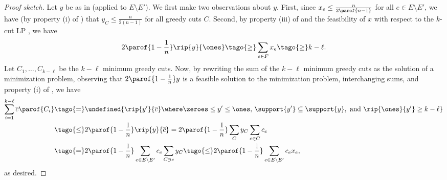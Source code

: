 \documentclass[11pt]{article}
\numberwithin{equation}{section}
\theoremstyle{definition}
\theoremstyle{plain}
\let\minof\undefined\usepackage{math} %
\newcommand{\costof}[1]{c_{#1}}
\providecommand{\sumcost}{\overline{c}\parof} %
\providecommand{\sumcostv}{\overline{c}} %
\newcommand{\wrt}{with respect to\xspace} %
\begin{document}
\bigskip

\begin{proof}[Proof sketch]
  Let $y$ be as in  (applied to $E \setminus
  E'$). We first make two observations about $y$. First, since
  \begin{math}
    x_e \leq \frac{n}{2 \parof{n-1}}
  \end{math}
  for all $e \in E \setminus E'$, we have (by property (i) of
  ) that
  \begin{math}
    y_C \leq \frac{n}{2(n-1)}
  \end{math}
  for all greedy cuts $C$. Second, by \tagr property (iii) of
   and \tagr the feasibility of $x$ \wrt the
  $k$-cut LP , we have
  \begin{align*}
    2 \parof{1 - \frac{1}{n}}\rip{y}{\ones}              %
    \tago{\geq}                    %
    \sum_{e \in F} x_e          %
    \tago{\geq}                 %
    k - \ell.
  \end{align*}
  Let $C_1,\dots,C_{k-\ell}$ be the $k-\ell$ minimum greedy cuts.
  Now, by \tagr rewriting the sum of the $k-\ell$ minimum greedy cuts
  as the solution of a minimization problem, \tagr observing that
  $2 \parof{1 - \frac{1}{n}} y$ is a feasible solution to the
  minimization problem, \tagr interchanging sums, and \tagr property
  (i) of , we have
  \begin{align*}
    \sum_{i=1}^{k-\ell} \sumcost{C_i} %
    &\tago{=}                                               %
      \minof{                                           %
      \rip{y'}{\sumcostv}                              %
      \where                                          %
      \zeroes \leq y' \leq \ones
      \text{, }                       %
      \support{y'} \subseteq \support{y},               %
      \text{ and }
      \rip{\ones}{y'} \geq k - \ell
      } \\
    &\tago{\leq}                       %
      2 \parof{1 - \frac{1}{n}}\rip{y}{\sumcostv} %
      =                         %
      2 \parof{1 - \frac{1}{n}} \sum_C y_C \sum_{e \in C} \costof{e} %
    \\
    &\tago{=}
      2 \parof{1 - \frac{1}{n}} \sum_{e \in E \setminus E'} \costof{e} \sum_{C \ni e} y_C %
      \tago{\leq}                                 %
      2 \parof{1 - \frac{1}{n}} \sum_{e \in E \setminus E'} c_e x_e,
  \end{align*}
  as desired.
\end{proof}
\end{document}
